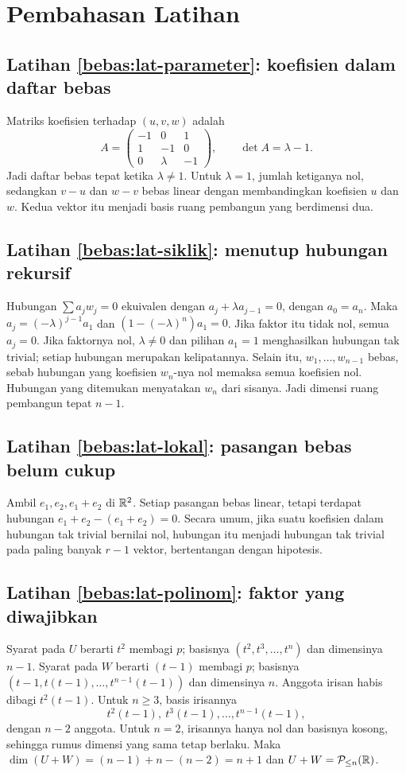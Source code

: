 \ifpembahasan
\section{Pembahasan Latihan}

\subsection*{Latihan \ref{bebas:lat-parameter}: koefisien dalam daftar bebas}
Matriks koefisien terhadap $(u,v,w)$ adalah
\[
    A=\begin{pmatrix}-1&0&1\\1&-1&0\\0&\lambda&-1\end{pmatrix},
    \qquad \det A=\lambda-1.
\]
Jadi daftar bebas tepat ketika $\lambda\ne1$.
Untuk $\lambda=1$, jumlah ketiganya nol, sedangkan $v-u$ dan
$w-v$ bebas linear dengan membandingkan koefisien $u$ dan $w$.
Kedua vektor itu menjadi basis ruang pembangun yang berdimensi dua.

\subsection*{Latihan \ref{bebas:lat-siklik}: menutup hubungan rekursif}
Hubungan $\sum a_jw_j=0$ ekuivalen dengan
$a_j+\lambda a_{j-1}=0$, dengan $a_0=a_n$.
Maka $a_j=(-\lambda)^{j-1}a_1$ dan
$(1-(-\lambda)^n)a_1=0$.
Jika faktor itu tidak nol, semua $a_j=0$.
Jika faktornya nol, $\lambda\ne0$ dan pilihan $a_1=1$
menghasilkan hubungan tak trivial; setiap hubungan merupakan
kelipatannya. Selain itu, $w_1,\ldots,w_{n-1}$ bebas, sebab
hubungan yang koefisien $w_n$-nya nol memaksa semua koefisien nol.
Hubungan yang ditemukan menyatakan $w_n$ dari sisanya.
Jadi dimensi ruang pembangun tepat $n-1$.

\subsection*{Latihan \ref{bebas:lat-lokal}: pasangan bebas belum cukup}
Ambil $e_1,e_2,e_1+e_2$ di $\mathbb{R}^2$.
Setiap pasangan bebas linear, tetapi terdapat hubungan
$e_1+e_2-(e_1+e_2)=0$.
Secara umum, jika suatu koefisien dalam hubungan tak trivial
bernilai nol, hubungan itu menjadi hubungan tak trivial pada
paling banyak $r-1$ vektor, bertentangan dengan hipotesis.

\subsection*{Latihan \ref{bebas:lat-polinom}: faktor yang diwajibkan}
Syarat pada $U$ berarti $t^2$ membagi $p$; basisnya
$(t^2,t^3,\ldots,t^n)$ dan dimensinya $n-1$.
Syarat pada $W$ berarti $(t-1)$ membagi $p$; basisnya
$(t-1,t(t-1),\ldots,t^{n-1}(t-1))$ dan dimensinya $n$.
Anggota irisan habis dibagi $t^2(t-1)$.
Untuk $n\ge3$, basis irisannya
\[
    t^2(t-1),\ t^3(t-1),\ldots,t^{n-1}(t-1),
\]
dengan $n-2$ anggota. Untuk $n=2$, irisannya hanya nol dan
basisnya kosong, sehingga rumus dimensi yang sama tetap berlaku.
Maka $\dim(U+W)=(n-1)+n-(n-2)=n+1$ dan
$U+W=\mathcal P_{\le n}(\mathbb{R})$.

